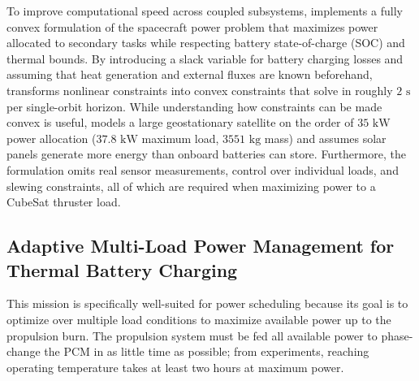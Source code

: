 To improve computational speed across coupled subsystems, \cite{doff-sottaSpacecraftEnergyManagement2022} implements a fully convex formulation of the spacecraft power problem that maximizes power allocated to secondary tasks while respecting battery state-of-charge (SOC) and thermal bounds. By introducing a slack variable for battery charging losses and assuming that heat generation and external fluxes are known beforehand, \cite{doff-sottaSpacecraftEnergyManagement2022} transforms nonlinear constraints into convex constraints that solve in roughly $2\text{ s}$ per single-orbit horizon. While understanding how constraints can be made convex is useful, \cite{doff-sottaSpacecraftEnergyManagement2022} models a large geostationary satellite on the order of $35\text{ kW}$ power allocation ($37.8\text{ kW}$ maximum load, $3551\text{ kg}$ mass) and assumes solar panels generate more energy than onboard batteries can store. Furthermore, the formulation omits real sensor measurements, control over individual loads, and slewing constraints, all of which are required when maximizing power to a CubeSat thruster load.

\subsection{Adaptive Multi-Load Power Management for Thermal Battery Charging}

This mission is specifically well-suited for power scheduling because its goal is to optimize over multiple load conditions to maximize available power up to the propulsion burn. The propulsion system must be fed all available power to phase-change the PCM in as little time as possible; from experiments, reaching operating temperature takes at least two hours at maximum power.

